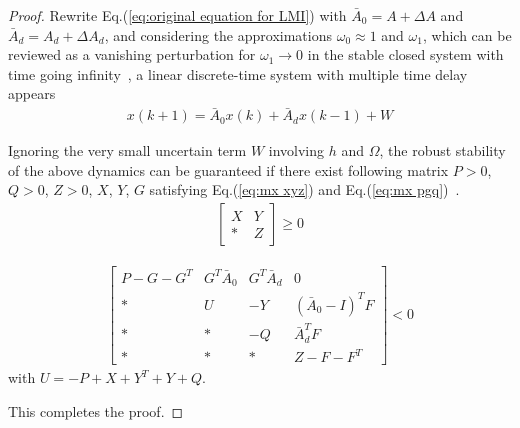 \documentclass[10pt,onecolumn,draftcls]{IEEEtran}
\begin{document}
\begin{proof}
	Rewrite Eq.(\ref{eq:original equation for LMI}) with $\bar A_0=A+\Delta A$ and $\bar A_d=A_d+\Delta A_d$, and considering the approximations $\omega_0\approx 1$ and $\omega_1$, which can be reviewed as a vanishing perturbation for $\omega_1\to 0$ in the stable closed system with time going infinity~\cite{Xu2008}, a linear discrete-time system with multiple time delay appears   
	\begin{align}
		x(k+1) = \bar A_0x(k)+\bar A_dx(k-1)+W
	\end{align}
	
	Ignoring the very small uncertain term $W$ involving $h$ and $\Omega$, the robust stability of the above dynamics can be guaranteed if there exist following matrix $P>0$, $Q>0$, $Z>0$, $X$, $Y$, $G$ satisfying Eq.(\ref{eq:mx xyz}) and Eq.(\ref{eq:mx pgq})~\cite{Gao2004}.
	\begin{align}\label{eq:mx xyz}  
		\begin{bmatrix}
			X &Y\\ * &Z
		\end{bmatrix}\ge 0
	\end{align}

		\begin{align}\label{eq:mx pgq}
			\begin{bmatrix}
				P-G-G^T &G^T\bar A_0 	&G^T\bar A_d 	&0\\
				 * 		&U	&-Y				&(\bar A_0-I)^TF\\
				 *		&*				&-Q				&\bar A_d^TF\\
				 *		&*				&*				&Z-F-F^T
			\end{bmatrix}< 0
		\end{align}
		with $U=-P+X+Y^T+Y+Q$.

    This completes the proof.\end{proof}

	
\end{document}
